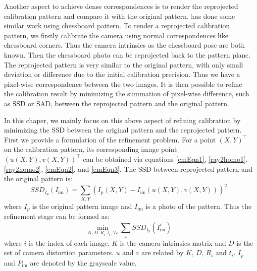 \documentclass{report}
\begin{document}
Another aspect to achieve dense correspondences is to render the reprojected calibration pattern and compare it with the original pattern. \cite{schiller2008calibration} has done some similar work using chessboard pattern. To render a reprojected calibration pattern, we firstly calibrate the camera using normal correspondences like chessboard corners. Thus the camera intrinsics as the chessboard pose are both known. Then the chessboard photo can be reprojected back to the pattern plane. The reprojected pattern is very similar to the original pattern, with only small deviation or difference due to the initial calibration precision. Thus we have a pixel-wise correspondence between the two images. It is then possible to refine the calibration result by minimizing the summation of pixel-wise difference, such as SSD or SAD, between the reprojected pattern and the original pattern. 

In this chaper, we mainly focus on this above aspect of refining calibration by minimizing the SSD between the original pattern and the reprojected pattern. First we provide a formulation of the refinement problem. For a point $(X, Y)^\top$ on the calibration pattern, its corresponding image point $(u(X, Y), v(X, Y))^\top$ can be obtained via equations \ref{cmEqn1}, \ref{ray2homo1}, \ref{ray2homo2}, \ref{cmEqn2}, and \ref{cmEqn3}. The SSD between reprojected pattern and the original pattern is: 
\begin{equation}
SSD_{I_p}(I_\text{im}) = \sum_{X, Y} \left(I_p(X, Y) - I_\text{im}(u(X, Y), v(X, Y))\right)^2
\end{equation}
where $I_p$ is the original pattern image and $I_\text{im}$ is a photo of the pattern. Thus the refinement stage can be formed as: 
\begin{equation}
\min_{K, D, R_i, t_i, \forall i} \sum_{i} SSD_{I_p}(I_\text{im}^i)
\label{SSDObjEqn}
\end{equation}
where $i$ is the index of each image. $K$ is the camera intrinsics matrix and $D$ is the set of camera distortion parameters. $u$ and $v$ are related by $K$, $D$, $R_i$ and $t_i$. $I_p$ and $P_\text{im}$ are denoted by the grayscale value.
\end{document}
